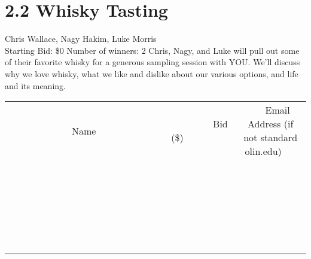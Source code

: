 \documentclass[11pt]{article}
\begin{document}
\section*{2.2 Whisky Tasting}
Chris Wallace, Nagy Hakim, Luke Morris
\\
Starting Bid: \$0
\newline
Number of winners: 2
\newline
Chris, Nagy, and Luke will pull out some of their favorite whisky for a generous sampling session with YOU. We'll discuss why we love whisky, what we like and dislike about our various options, and life and its meaning.
\\[6ex]
\begin{tabular}{c c c}
~~~~~~~~~~~~~Name~~~~~~~~~~~~~ & ~~~~~~~~~Bid (\$)~~~~~~~~~  & ~~~Email Address (if not standard olin.edu)~~~\\
 & & \\
\hline
 & & \\
\hline
 & & \\
\hline
 & & \\
\hline
 & & \\
\hline
 & & \\
\hline
 & & \\
\hline
 & & \\
\hline
 & & \\
\hline
 & & \\
\hline
 & & \\
\hline
 & & \\
\hline
 & & \\
\hline
 & & \\
\hline
 & & \\
\hline
 & & \\
\hline
 & & \\
\hline
 & & \\
\hline
 & & \\
\hline
 & & \\
\hline
 & & \\
\hline
 & & \\
\hline
 & & \\
\hline
 & & \\
\hline
 & & \\
\hline
 & & \\
\hline
\end{tabular}
\newpage
\end{document}

